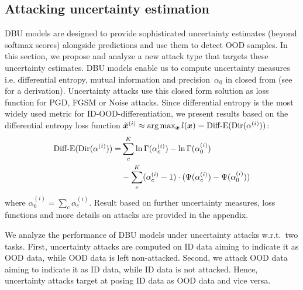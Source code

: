 








\subsection{Attacking uncertainty estimation}
\label{subsec:uncertainty_attacks}

DBU models are designed to provide sophisticated uncertainty estimates (beyond softmax scores) alongside predictions and use them to detect OOD samples. In this section, we propose and analyze a new attack type that targets these uncertainty estimates. 
DBU models enable us to compute uncertainty measures i.e. differential entropy, mutual information and precision~$\alpha_0$ in closed from (see \citep{malini2018} for a derivation). Uncertainty attacks use this closed form solution as loss function for PGD, FGSM or Noise attacks. 
Since differential entropy is the most widely used metric for ID-OOD-differentiation, we present results based on the differential entropy loss function $\tilde{{\bm{x}}}^{(i)} \approx \arg\max_{{\bm{x}}} l({\bm{x}}) = \text{Diff-E}(\text{Dir}(\mathbf{\alpha}^{(i)}))$: 
%
\begin{equation}
\begin{aligned}
	\text{Diff-E}(\text{Dir}(\mathbf{\alpha}^{(i)}))  = &\sum_c^K \ln \Gamma (\alpha_c^{(i)}) - \ln \Gamma (\alpha_0^{(i)}) \\
	&- \sum_c^K (\alpha_c^{(i)} -1) \cdot (\Psi (\alpha_c^{(i)}) - \Psi (\alpha_0^{(i)}))
\end{aligned}
\end{equation}
%
where $\alpha_0^{(i)} = \sum_c \alpha_c^{(i)}$. 
Result based on further uncertainty measures, loss functions and more details on attacks are provided in the appendix. 


We analyze the performance of DBU models under uncertainty attacks w.r.t.\ two tasks. First, uncertainty attacks are computed on ID data aiming to indicate it as OOD data, while OOD data is left non-attacked. Second, we attack OOD data aiming to indicate it as ID data, while ID data is not attacked. Hence, uncertainty attacks target at posing ID data as OOD data and vice versa.


